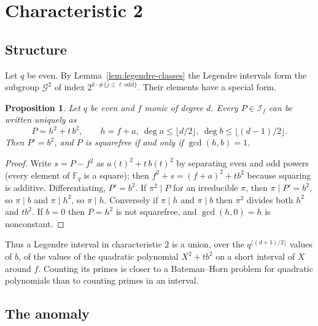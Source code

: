 \documentclass[11pt,a4paper]{article}
\newtheorem{proposition}[theorem]{Proposition}
\theoremstyle{definition}
\theoremstyle{remark}
\newcommand{\Fq}{\mathbb{F}_q}
\newcommand{\cI}{\mathcal{I}}
\newcommand{\cG}{\mathcal{G}}
\begin{document}
\section{Characteristic 2}\label{sec:char2}

\subsection{Structure}
Let $q$ be even. By Lemma~\ref{lem:legendre-classes} the Legendre intervals form the subgroup $\cG^2$ of
index $2^{k\cdot\#\{j\le\ell\ \mathrm{odd}\}}$. Their elements have a special form.

\begin{proposition}\label{prop:char2}
Let $q$ be even and $f$ monic of degree $d$. Every $P\in\cI_f$ can be written uniquely as
\[
 P=h^2+t\,b^2,\qquad h=f+a,\ \deg a\le\lfloor d/2\rfloor,\ \deg b\le\lfloor(d-1)/2\rfloor .
\]
Then $P'=b^2$, and $P$ is squarefree if and only if $\gcd(h,b)=1$.
\end{proposition}

\begin{proof}
Write $s=P-f^2$ as $a(t)^2+t\,b(t)^2$ by separating even and odd powers (every element of $\Fq$ is a
square); then $f^2+s=(f+a)^2+tb^2$ because squaring is additive. Differentiating, $P'=b^2$. If $\pi^2\mid P$
for an irreducible $\pi$, then $\pi\mid P'=b^2$, so $\pi\mid b$ and $\pi\mid h^2$, so $\pi\mid h$. Conversely if
$\pi\mid h$ and $\pi\mid b$ then $\pi^2$ divides both $h^2$ and $tb^2$. If $b=0$ then $P=h^2$ is not squarefree,
and $\gcd(h,0)=h$ is nonconstant.
\end{proof}

Thus a Legendre interval in characteristic $2$ is a union, over the $q^{\lfloor(d+1)/2\rfloor}$ values of $b$,
of the values of the quadratic polynomial $X^2+tb^2$ on a short interval of $X$ around $f$. Counting its
primes is closer to a Bateman--Horn problem for quadratic polynomials than to counting primes in an interval.

\subsection{The anomaly}

\begin{table}[ht]
\centering\small

\caption{Characteristic 2. The two variance columns are the mean of $(\Psi-q^{d+1})^2/q^{d+1}$ over all
classes of $\cG$ and over the Legendre intervals $\cG^2$; ``mean'' is the mean of $\Psi/q^{d+1}$ over $\cG^2$;
``ratio'' is the quotient of the two variances, and ``excess'' is $1+\sum_{\varepsilon\ne1}\rho(\varepsilon)$ from
\eqref{eq:rho}. Source: \texttt{data/char2\_variance.csv}.}
\label{tab:char2}
\end{table}
\end{document}
